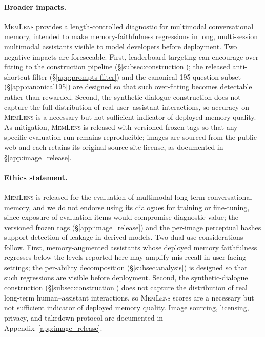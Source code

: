 \documentclass{llmxive}
\providecommand{\bench}{\textsc{MemLens}}
\begin{document}
\paragraph{Broader impacts.}
\label{app:broader_impacts}
\bench{} provides a length-controlled diagnostic for multimodal conversational memory, intended to make memory-faithfulness regressions in long, multi-session multimodal assistants visible to model developers before deployment. Two negative impacts are foreseeable. First, leaderboard targeting can encourage over-fitting to the construction pipeline (\S\ref{subsec:construction}); the released anti-shortcut filter (\S\ref{app:prompts-filter}) and the canonical 195-question subset (\S\ref{app:canonical195}) are designed so that such over-fitting becomes detectable rather than rewarded. Second, the synthetic dialogue construction does not capture the full distribution of real user--assistant interactions, so accuracy on \bench{} is a necessary but not sufficient indicator of deployed memory quality. As mitigation, \bench{} is released with versioned frozen tags so that any specific evaluation run remains reproducible; images are sourced from the public web and each retains its original source-site license, as documented in \S\ref{app:image_release}.

\paragraph{Ethics statement.}
\bench{} is released for the evaluation of multimodal long-term conversational memory, and we do not endorse using its dialogues for training or fine-tuning, since exposure of evaluation items would compromise diagnostic value; the versioned frozen tags (\S\ref{app:image_release}) and the per-image perceptual hashes support detection of leakage in derived models. Two dual-use considerations follow. First, memory-augmented assistants whose deployed memory faithfulness regresses below the levels reported here may amplify mis-recall in user-facing settings; the per-ability decomposition (\S\ref{subsec:analysis}) is designed so that such regressions are visible before deployment. Second, the synthetic-dialogue construction (\S\ref{subsec:construction}) does not capture the distribution of real long-term human--assistant interactions, so \bench{} scores are a necessary but not sufficient indicator of deployed memory quality. Image sourcing, licensing, privacy, and takedown protocol are documented in Appendix~\ref{app:image_release}.
\end{document}
